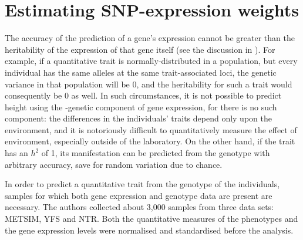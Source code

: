 \documentclass[../main.tex]{subfiles}
\begin{document}
\section{Estimating SNP-expression weights}

The accuracy of the prediction of a gene's expression cannot be greater 
than the heritability of the expression of that gene itself (see the 
discussion in ). For example, if a quantitative 
trait is normally-distributed in a population, but every individual has 
the same alleles at the same trait-associated loci, the genetic variance 
in that population will be 0, and the heritability for such a trait 
would consequently be 0 as well. In such circumstances, it is not 
possible to predict height using the \cis-genetic component of gene 
expression, for there is no such component: the differences in the 
individuals' traits depend only upon the environment, and it is 
notoriously difficult to quantitatively measure the effect of 
environment, especially outside of the laboratory. On the other hand, if 
the trait has an $h^2$ of 1, its manifestation can be predicted from the 
genotype with arbitrary accuracy, save for random variation due to 
chance.

In order to predict a quantitative trait from the genotype of the 
individuals, samples for which both gene expression and genotype data 
are present are necessary. The authors collected about 3,000 samples 
from three data sets: METSIM, YFS and NTR. Both the quantitative 
measures of the phenotypes and the gene expression levels were 
normalised and standardised before the analysis.

\end{document}
